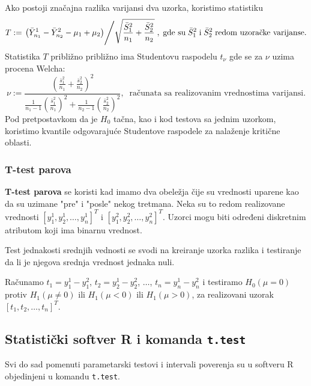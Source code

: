 \documentclass[twoside,titlepage,12pt,a4paper]{book}
\numberwithin{equation}{chapter}
\begin{document}
Ako postoji značajna razlika varijansi dva uzorka, koristimo statistiku
\[
T := \left. \left( \bar{Y}_{n_1}^1 - \bar{Y}_{n_2}^2 - \mu_1 + \mu_2 \right) \middle/ \sqrt{\frac{\bar{S}_1^{2}}{n_1} + \frac{\bar{S}_2^{2}}{n_2}} \right., \;\mbox{gde su}\;
\bar{S}_1^{2} \;\mbox{i}\; \bar{S}_2^{2} \;\mbox{redom uzoračke varijanse.}
\]
Statistika $T$ približno približno ima Studentovu raspodelu $t_{\nu}$ gde se za ${\nu}$ uzima procena Welcha:
\[\nu := \frac{\left( \frac{\bar{s}_1^{2}}{n_1} + \frac{\bar{s}_2^{2}}{n_2} \right)^2}{\frac{1}{n_1 - 1} \left( \frac{\bar{s}_1^{2}}{n_1} \right)^2 + \frac{1}{n_2 - 1} \left( \frac{\bar{s}_2^{2}}{n_2} \right)^2}, \;\;\mbox{računata sa realizovanim vrednostima varijansi.}\]
Pod pretpostavkom da je $H_0$ tačna, kao i kod testova sa jednim uzorkom, koristimo kvantile odgovarajuće Studentove raspodele za nalaženje kritične oblasti.

\subsubsection{T-test parova}

\textbf{T-test parova} se koristi kad imamo dva obeležja čije su vrednosti uparene kao da su uzimane "{}pre"{} i "{}posle"{} nekog tretmana. Neka su to redom realizovane vrednosti $[ y_1^1, y_2^1, \ldots, y_{n}^1 ]^T$ i $[ y_1^2, y_2^2, \ldots, y_{n}^2 ]^T$. Uzorci mogu biti određeni diskretnim atributom koji ima binarnu vrednost.

Test jednakosti srednjih vednosti se svodi na kreiranje uzorka razlika i testiranje da li je njegova srednja vrednost jednaka nuli.

Računamo $t_1 = y_1^1 - y_1^2$, $t_2 = y_2^1 - y_2^2$, $\ldots$, $t_n = y_n^1 - y_n^2$ i testiramo $H_0 ( \mu = 0 )$ protiv $H_1 ( \mu \neq 0 )$ ili $H_1 ( \mu < 0 )$ ili $H_1 ( \mu > 0 )$, za realizovani uzorak $[ t_1, t_2, \ldots, t_n ]^T$.

\subsection{Statistički softver R i komanda \texttt{t.test}}

Svi do sad pomenuti parametarski testovi i intervali poverenja su u softveru R objedinjeni u komandu \texttt{t.test}.
\end{document}
